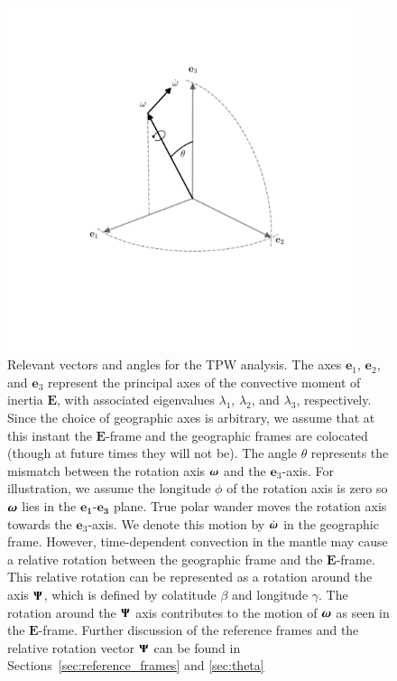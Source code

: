 \documentclass[preprint,12pt,authoryear]{elsarticle}
\newcommand{\mitbf}[1]{\hbox{\mathversion{bold}$#1$}}
\begin{document}
\begin{figure}
\centering
\includegraphics[width=0.9\textwidth]{figures/reference_frames.pdf}
\caption[Relevant vectors and angles for the TPW analysis.]{Relevant vectors and angles for the TPW analysis. The axes $\mathbf{e}_1$, $\mathbf{e}_2$, and $\mathbf{e}_3$ represent the principal axes of the convective moment of inertia $\mathbf{E}$, with associated eigenvalues $\lambda_1$, $\lambda_2$, and $\lambda_3$, respectively. Since the choice of geographic axes is arbitrary, we assume that at this instant the $\mathbf{E}$-frame and the geographic frames are colocated (though at future times they will not be). The angle $\theta$ represents the mismatch between the rotation axis $\mitbf{\omega}$ and the $\mathbf{e}_3$-axis. For illustration, we assume the longitude $\phi$ of the rotation axis is zero so $\mitbf{\omega}$ lies in the $\mathbf{e_1}$-$\mathbf{e_3}$ plane. True polar wander moves the rotation axis towards the $\mathbf{e}_3$-axis. We denote this motion by $\dot{\mitbf{\omega}}$ in the geographic frame. However, time-dependent convection in the mantle may cause a relative rotation between the geographic frame and the $\mathbf{E}$-frame. This relative rotation can be represented as a rotation around the axis $\mitbf{\Psi}$, which is defined by colatitude $\beta$ and longitude $\gamma$. The rotation around the $\mitbf{\Psi}$ axis contributes to the motion of $\mitbf{\omega}$ as seen in the $\mathbf{E}$-frame.  Further discussion of the reference frames and the relative rotation vector $\mitbf{\Psi}$ can be found in Sections~\ref{sec:reference_frames} and \ref{sec:theta}}
\label{fig:reference_frames}
\end{figure}
\end{document}
